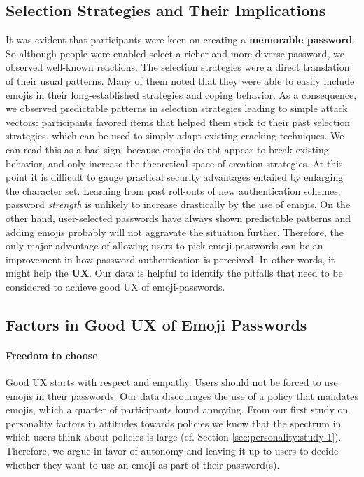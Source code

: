 \subsection{Selection Strategies and Their Implications}
It was evident that participants were keen on creating a \textbf{memorable password}. So although people were enabled select a richer and more diverse password, we observed well-known reactions. 
The selection strategies were a direct translation of their usual patterns. Many of them noted that they were able to easily include emojis in their long-established strategies and coping behavior. As a consequence, we observed predictable patterns in selection strategies leading to simple attack vectors: participants favored items that helped them stick to their past selection strategies, which can be used to simply adapt existing cracking techniques.
We can read this as a bad sign, because emojis do not appear to break existing behavior, and only increase the theoretical space of creation strategies. At this point it is difficult to gauge practical security advantages entailed by enlarging the character set. Learning from past roll-outs of new authentication schemes, password \textit{strength} is unlikely to increase drastically by the use of emojis. 
On the other hand, user-selected passwords have always shown predictable patterns and adding emojis probably will not aggravate the situation further. Therefore, the only major advantage of allowing users to pick emoji-passwords can be an improvement in how password authentication is perceived. In other words, it might help the \textbf{\gls{UX}}. Our data is helpful to identify the pitfalls that need to be considered to achieve good UX of emoji-passwords. 

\subsection{Factors in Good UX of Emoji Passwords}
\paragraph{Freedom to choose} Good UX starts with respect and empathy. Users should not be forced to use emojis in their passwords. Our data discourages the use of a policy that mandates emojis, which a quarter of participants found annoying. From our first study on personality factors in attitudes towards policies we know that the spectrum in which users think about policies is large (cf. Section \ref{sec:personality:study-1}). Therefore, we argue in favor of autonomy and leaving it up to users to decide whether they want to use an emoji as part of their password(s). 

